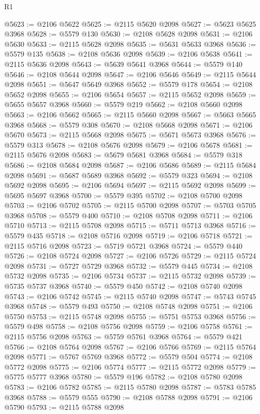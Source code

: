 \begin{lexlean}{R1}
\begin{coremodule}
@5623 := @2106 @5622
@5625 := @2115 @5620 @2098
@5627 := @5623 @5625 @3968
@5628 := @5579 @130
@5630 := @2108 @5628 @2098
@5631 := @2106 @5630
@5633 := @2115 @5628 @2098
@5635 := @5631 @5633 @3968
@5636 := @5579 @135
@5638 := @2108 @5636 @2098
@5639 := @2106 @5638
@5641 := @2115 @5636 @2098
@5643 := @5639 @5641 @3968
@5644 := @5579 @140
@5646 := @2108 @5644 @2098
@5647 := @2106 @5646
@5649 := @2115 @5644 @2098
@5651 := @5647 @5649 @3968
@5652 := @5579 @178
@5654 := @2108 @5652 @2098
@5655 := @2106 @5654
@5657 := @2115 @5652 @2098
@5659 := @5655 @5657 @3968
@5660 := @5579 @219
@5662 := @2108 @5660 @2098
@5663 := @2106 @5662
@5665 := @2115 @5660 @2098
@5667 := @5663 @5665 @3968
@5668 := @5579 @308
@5670 := @2108 @5668 @2098
@5671 := @2106 @5670
@5673 := @2115 @5668 @2098
@5675 := @5671 @5673 @3968
@5676 := @5579 @313
@5678 := @2108 @5676 @2098
@5679 := @2106 @5678
@5681 := @2115 @5676 @2098
@5683 := @5679 @5681 @3968
@5684 := @5579 @318
@5686 := @2108 @5684 @2098
@5687 := @2106 @5686
@5689 := @2115 @5684 @2098
@5691 := @5687 @5689 @3968
@5692 := @5579 @323
@5694 := @2108 @5692 @2098
@5695 := @2106 @5694
@5697 := @2115 @5692 @2098
@5699 := @5695 @5697 @3968
@5700 := @5579 @395
@5702 := @2108 @5700 @2098
@5703 := @2106 @5702
@5705 := @2115 @5700 @2098
@5707 := @5703 @5705 @3968
@5708 := @5579 @400
@5710 := @2108 @5708 @2098
@5711 := @2106 @5710
@5713 := @2115 @5708 @2098
@5715 := @5711 @5713 @3968
@5716 := @5579 @435
@5718 := @2108 @5716 @2098
@5719 := @2106 @5718
@5721 := @2115 @5716 @2098
@5723 := @5719 @5721 @3968
@5724 := @5579 @440
@5726 := @2108 @5724 @2098
@5727 := @2106 @5726
@5729 := @2115 @5724 @2098
@5731 := @5727 @5729 @3968
@5732 := @5579 @445
@5734 := @2108 @5732 @2098
@5735 := @2106 @5734
@5737 := @2115 @5732 @2098
@5739 := @5735 @5737 @3968
@5740 := @5579 @450
@5742 := @2108 @5740 @2098
@5743 := @2106 @5742
@5745 := @2115 @5740 @2098
@5747 := @5743 @5745 @3968
@5748 := @5579 @493
@5750 := @2108 @5748 @2098
@5751 := @2106 @5750
@5753 := @2115 @5748 @2098
@5755 := @5751 @5753 @3968
@5756 := @5579 @498
@5758 := @2108 @5756 @2098
@5759 := @2106 @5758
@5761 := @2115 @5756 @2098
@5763 := @5759 @5761 @3968
@5764 := @5579 @421
@5766 := @2108 @5764 @2098
@5767 := @2106 @5766
@5769 := @2115 @5764 @2098
@5771 := @5767 @5769 @3968
@5772 := @5579 @504
@5774 := @2108 @5772 @2098
@5775 := @2106 @5774
@5777 := @2115 @5772 @2098
@5779 := @5775 @5777 @3968
@5780 := @5579 @196
@5782 := @2108 @5780 @2098
@5783 := @2106 @5782
@5785 := @2115 @5780 @2098
@5787 := @5783 @5785 @3968
@5788 := @5579 @555
@5790 := @2108 @5788 @2098
@5791 := @2106 @5790
@5793 := @2115 @5788 @2098

\end{coremodule}
\end{lexlean}
